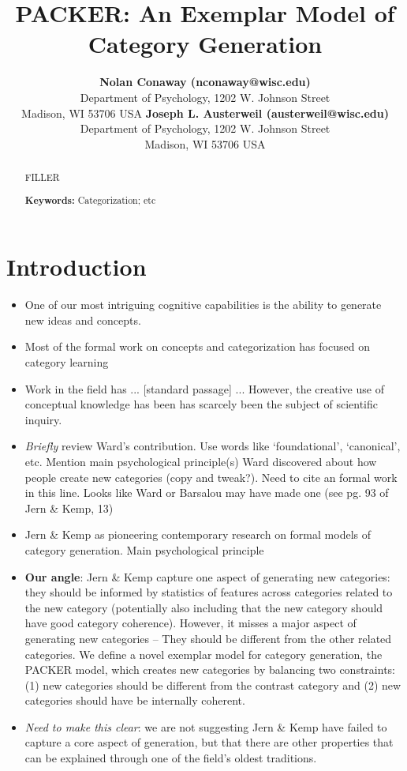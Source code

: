 \documentclass[10pt,letterpaper]{article}
\title{PACKER: An Exemplar Model of Category Generation}
\author{
{\large \bf Nolan Conaway (nconaway@wisc.edu)} \\
Department of Psychology, 1202 W. Johnson Street \\
Madison, WI 53706 USA
  \AND 
{\large \bf Joseph L. Austerweil (austerweil@wisc.edu)} \\
Department of Psychology, 1202 W. Johnson Street \\
Madison, WI 53706 USA
}
\begin{document}
\maketitle

\begin{abstract}
FILLER

\textbf{Keywords:} 
Categorization; etc
\end{abstract}

\section{Introduction}

\begin{itemize}
\item One of our most intriguing cognitive capabilities is the ability to generate new ideas and concepts.
\item Most of the formal work on concepts and categorization has focused on category learning
\item Work in the field has ... [standard passage] ... However, the creative use of conceptual knowledge has been has scarcely been the subject of scientific inquiry.
\item \textit{Briefly} review Ward's contribution. Use words like `foundational', `canonical', etc. Mention main psychological principle(s) Ward discovered about how people create new categories (copy and tweak?). Need to cite an formal work in this line. Looks like Ward or Barsalou may have made one (see pg. 93 of Jern \& Kemp, 13)
\item Jern \& Kemp as pioneering contemporary research on formal models of category generation. Main psychological principle 
\item \textbf{Our angle}: Jern \& Kemp capture one aspect of generating new categories: they should be informed by statistics of features across categories related to the new category (potentially also including that the new category should have good category coherence). However, it misses a major aspect of generating new categories -- They should be different from the other related categories. We define a novel exemplar model for category generation, the PACKER model, which creates new categories by balancing two constraints: (1) new categories should be different from the contrast category and (2) new categories should have be internally coherent.
\item \textit{Need to make this clear}: we are not suggesting Jern \& Kemp have failed to capture a core aspect of generation, but that there are other properties that can be explained through one of the field's oldest traditions.

\end{itemize}
\end{document}
